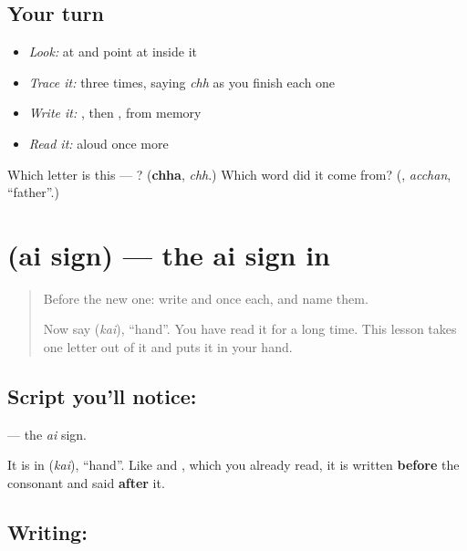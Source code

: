 \subsection*{Your turn}
\begin{itemize}
\raggedright
  \item \emph{Look:} at \textbf{} and point at  inside it
  \item \emph{Trace it:}  three times, saying \emph{chh} as you finish each one
  \item \emph{Write it:} , then , from memory
  \item \emph{Read it:} \textbf{} aloud once more
\end{itemize}

\begin{tcolorbox}[breakable,colback=teal!4,colframe=teal!35!black,title={Before you move on}]
Which letter is this — ? (\textbf{chha}, \emph{chh}.) Which word did it come from? (\textbf{}, \emph{acchan}, \textquotedblleft{}father\textquotedblright{}.)
\end{tcolorbox}
\section[\texorpdfstring{\ml{ൈ} (ai sign)}{ൈ (ai sign)}]{ (ai sign) — the ai sign in }

\label{lesson:ML-W114-ai-sign}



\begin{quote}
Before the new one: write  and  once each, and name them.

Now say \textbf{} (\emph{kai}), \textquotedblleft{}hand\textquotedblright{}. You have read it for a long time. This lesson takes one letter out of it and puts it in your hand.
\end{quote}

\subsection*{Script you'll notice: }
\textbf{} — the \emph{ai} sign.

It is in \textbf{} (\emph{kai}), \textquotedblleft{}hand\textquotedblright{}. Like \textbf{} and \textbf{}, which you already read, it is written \textbf{before} the consonant and said \textbf{after} it.

\subsection*{Writing: }

